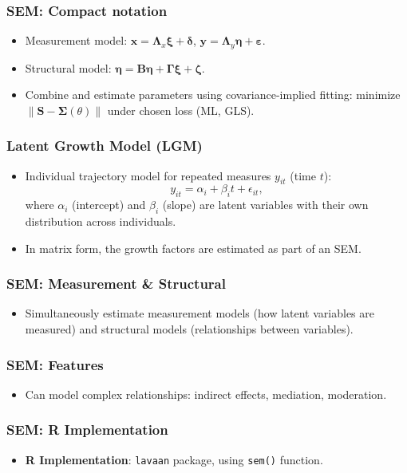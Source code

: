 \documentclass{beamer}
\newcommand{\code}[1]{\texttt{#1}}
\begin{document}
\begin{frame}
    \frametitle{SEM: Compact notation}
    \begin{itemize}
        \item Measurement model: $\mathbf{x}=\mathbf{\Lambda}_x\mathbf{\xi}+\boldsymbol{\delta}$, $\mathbf{y}=\mathbf{\Lambda}_y\mathbf{\eta}+\boldsymbol{\varepsilon}$.
        \item Structural model: $\mathbf{\eta}=\mathbf{B}\mathbf{\eta}+\mathbf{\Gamma}\mathbf{\xi}+\boldsymbol{\zeta}$.
        \item Combine and estimate parameters using covariance-implied fitting: minimize $\|\mathbf{S}-\boldsymbol{\Sigma}(\theta)\|$ under chosen loss (ML, GLS).
    \end{itemize}
\end{frame}

\begin{frame}
    \frametitle{Latent Growth Model (LGM)}
    \begin{itemize}
        \item Individual trajectory model for repeated measures $y_{it}$ (time $t$):
        \[y_{it}=\alpha_i+\beta_i t+\epsilon_{it},\]
        where $\alpha_i$ (intercept) and $\beta_i$ (slope) are latent variables with their own distribution across individuals.
        \item In matrix form, the growth factors are estimated as part of an SEM.
    \end{itemize}
\end{frame}

\begin{frame}
    \frametitle{SEM: Measurement \& Structural}
    \begin{itemize}
        \item Simultaneously estimate measurement models (how latent variables are measured) and structural models (relationships between variables).
    \end{itemize}
\end{frame}

\begin{frame}
    \frametitle{SEM: Features}
    \begin{itemize}
        \item Can model complex relationships: indirect effects, mediation, moderation.
    \end{itemize}
\end{frame}

\begin{frame}
    \frametitle{SEM: R Implementation}
    \begin{itemize}
        \item \textbf{R Implementation}: \code{lavaan} package, using \code{sem()} function.
    \end{itemize}
\end{frame}
\end{document}
